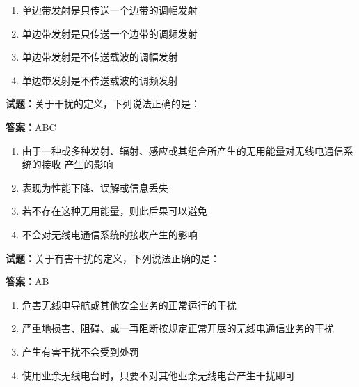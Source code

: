 \documentclass{ctexbook}
\begin{document}
\begin{enumerate}[leftmargin=3em]
  \item 单边带发射是只传送一个边带的调幅发射 

  \item 单边带发射是只传送一个边带的调频发射 

  \item 单边带发射是不传送载波的调幅发射 


  \item 单边带发射是不传送载波的调频发射 

\end{enumerate}





\vspace{1em}

\textbf{试题：}关于干扰的定义，下列说法正确的是： 

\textbf{答案：}ABC 

\begin{enumerate}[leftmargin=3em]
  \item 由于一种或多种发射、辐射、感应或其组合所产生的无用能量对无线电通信系统的接收
产生的影响 

  \item 表现为性能下降、误解或信息丢失 

  \item 若不存在这种无用能量，则此后果可以避免 

  \item 不会对无线电通信系统的接收产生的影响 

\end{enumerate}





\vspace{1em}

\textbf{试题：}关于有害干扰的定义，下列说法正确的是： 

\textbf{答案：}AB 

\begin{enumerate}[leftmargin=3em]
  \item 危害无线电导航或其他安全业务的正常运行的干扰 

  \item 严重地损害、阻碍、或一再阻断按规定正常开展的无线电通信业务的干扰 

  \item 产生有害干扰不会受到处罚 

  \item 使用业余无线电台时，只要不对其他业余无线电台产生干扰即可 

\end{enumerate}
\end{document}
